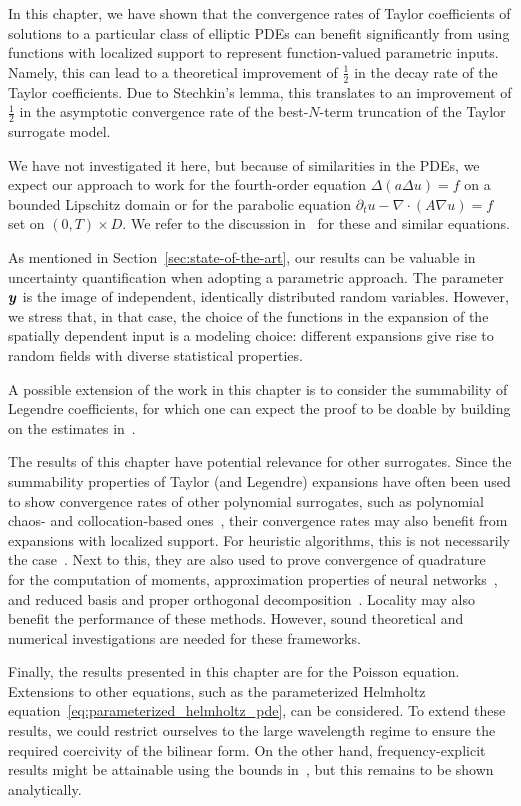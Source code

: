 In this chapter, we have shown that the convergence rates of Taylor coefficients of solutions to a particular class of elliptic PDEs can benefit significantly from using functions with localized support to represent function-valued parametric inputs.
Namely, this can lead to a theoretical improvement of $\frac{1}{2}$ in the decay rate of the Taylor coefficients.
Due to Stechkin's lemma, this translates to an improvement of $\frac{1}{2}$ in the asymptotic convergence rate of the best-$N$-term truncation of the Taylor surrogate model.

We have not investigated it here, but because of similarities in the PDEs, we expect our approach to work for the fourth-order equation $\Delta(a\Delta u)=f$ on a bounded Lipschitz domain or for the parabolic equation $\partial_t u-\nabla \cdot(A\nabla u) = f$ set on $(0,T)\times D$.
We refer to the discussion in~\cite{bachmayr2017a} for these and similar equations.

As mentioned in Section~\ref{sec:state-of-the-art}, our results can be valuable in uncertainty quantification when adopting a parametric approach.
The parameter ${\bm{y}}$ is the image of independent, identically distributed random variables.
However, we stress that, in that case, the choice of the functions in the expansion of the spatially dependent input is a modeling choice: different expansions give rise to random fields with diverse statistical properties.

A possible extension of the work in this chapter is to consider the summability of Legendre coefficients, for which one can expect the proof to be doable by building on the estimates in~\cite{bachmayr2017a,dung2022}.

The results of this chapter have potential relevance for other surrogates.
Since the summability properties of Taylor (and Legendre) expansions have often been used to show convergence rates of other polynomial surrogates, such as polynomial chaos- and collocation-based ones~\cite{beck2014,beck2012,chkifa2014}, their convergence rates may also benefit from expansions with localized support.
For heuristic algorithms, this is not necessarily the case~\cite{ernst2021}.
Next to this, they are also used to prove convergence of quadrature~\cite{dick2016,schillings2013,zech2020} for the computation of moments, approximation properties of neural networks~\cite{opschoor2022,schwab2019}, and reduced basis and proper orthogonal decomposition~\cite{bachmayr2017a,cohen2015}.
Locality may also benefit the performance of these methods.
However, sound theoretical and numerical investigations are needed for these frameworks.

Finally, the results presented in this chapter are for the Poisson equation.
Extensions to other equations, such as the parameterized Helmholtz equation~\eqref{eq:parameterized_helmholtz_pde}, can be considered.
To extend these results, we could restrict ourselves to the large wavelength regime to ensure the required coercivity of the bilinear form.
On the other hand, frequency-explicit results might be attainable using the bounds in~\cite{moiola2019}, but this remains to be shown analytically.